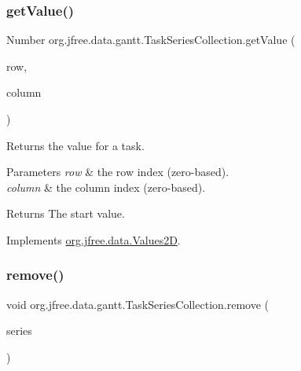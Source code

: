 \subsubsection{\texorpdfstring{get\+Value()}{getValue()}\hspace{0.1cm}{\footnotesize\ttfamily [2/2]}}
{\footnotesize\ttfamily Number org.\+jfree.\+data.\+gantt.\+Task\+Series\+Collection.\+get\+Value (\begin{DoxyParamCaption}\item[{int}]{row,  }\item[{int}]{column }\end{DoxyParamCaption})}

Returns the value for a task.


\begin{DoxyParams}{Parameters}
{\em row} & the row index (zero-\/based). \\
\hline
{\em column} & the column index (zero-\/based).\\
\hline
\end{DoxyParams}
\begin{DoxyReturn}{Returns}
The start value. 
\end{DoxyReturn}


Implements \mbox{\hyperlink{interfaceorg_1_1jfree_1_1data_1_1_values2_d_a0797937d3ac62e18b300eef1fe906ec6}{org.\+jfree.\+data.\+Values2D}}.

\mbox{\label{classorg_1_1jfree_1_1data_1_1gantt_1_1_task_series_collection_ad2538fd7634247366da097b4388830b5}} 
\subsubsection{\texorpdfstring{remove()}{remove()}\hspace{0.1cm}{\footnotesize\ttfamily [1/2]}}
{\footnotesize\ttfamily void org.\+jfree.\+data.\+gantt.\+Task\+Series\+Collection.\+remove (\begin{DoxyParamCaption}\item[{\mbox{\hyperlink{classorg_1_1jfree_1_1data_1_1gantt_1_1_task_series}{Task\+Series}}}]{series }\end{DoxyParamCaption})}

